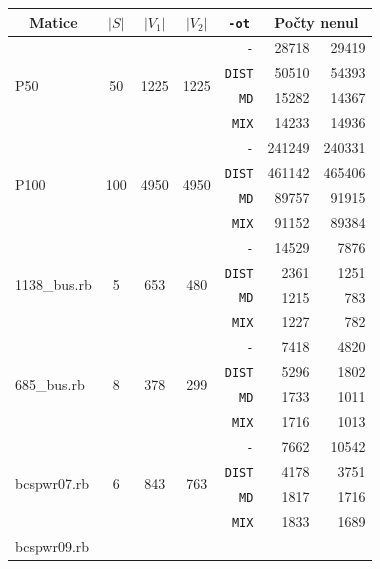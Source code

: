 \documentclass[11pt,american,czech,oneside]{book}
\theoremstyle{plain}
\theoremstyle{definition}
\begin{document}
\bigskip
{\noindent
\footnotesize
  \centering
  \renewcommand{\arraystretch}{1.1}
\begin{longtable}{|l|c|c|c|r|r|r|}
  \hline
  \multicolumn{1}{|c|}{Matice} & \multicolumn{1}{|c|}{$|S|$}    &\multicolumn{1}{|c|}{$|V_1|$} &\multicolumn{1}{|c|}{$|V_2|$} & \multicolumn{1}{|c|}{\texttt{-ot}} & \multicolumn{2}{c|}{Počty nenul} \\
  \hline
  \multirow{4}{*}{P50}
    &	\multirow{4}{*}{50}	&	\multirow{4}{*}{1225}	&	\multirow{4}{*}{1225}	&\texttt{-} &	28718	&	29419	\\
    &	&	&	&\texttt{DIST} &	50510	&	54393	\\
    &	&	&	&\texttt{MD} &	15282	&	14367	\\
    &	&	&	&\texttt{MIX} &	14233	&	14936	\\
    \hline
  \multirow{4}{*}{P100}
    &	\multirow{4}{*}{100}	&	\multirow{4}{*}{4950}	&	\multirow{4}{*}{4950}	&\texttt{-}&	241249	&	240331	\\
    &	&	&	&\texttt{DIST}&	461142	&	465406	\\
    &	&	&	&\texttt{MD}&	89757	&	91915	\\
    &	&	&	&\texttt{MIX}&	91152	&	89384	\\
    \hline
  \multirow{4}{*}{1138\_bus.rb}
    &	\multirow{4}{*}{5}	&	\multirow{4}{*}{653}	&	\multirow{4}{*}{480}	&\texttt{-}    &	14529	&	7876	\\
    & & & &\texttt{DIST} &	2361	&	1251	\\
    & & & &\texttt{MD}   &	1215	&	783	\\
    & & & &\texttt{MIX}  &	1227	&	782	\\
    \hline
  \multirow{4}{*}{685\_bus.rb	}
    &	\multirow{4}{*}{8}	&	\multirow{4}{*}{378}	&	\multirow{4}{*}{299}	&\texttt{-}    &	7418	&	4820	\\
    & & & &\texttt{DIST} &	5296	&	1802	\\
    & & & &\texttt{MD}   &	1733	&	1011	\\
    & & & &\texttt{MIX}  &	1716	&	1013	\\
    \hline
  \multirow{4}{*}{bcspwr07.rb	}
    &	\multirow{4}{*}{6}	&	\multirow{4}{*}{843}	&	\multirow{4}{*}{763}	&\texttt{-}    &	7662	&	10542	\\
    & & & &\texttt{DIST} &	4178	&	3751	\\
    & & & &\texttt{MD}   &	1817	&	1716	\\
    & & & &\texttt{MIX}  &	1833	&	1689	\\
    \hline
  \multirow{4}{*}{bcspwr09.rb	}

\end{longtable}}
\end{document}
